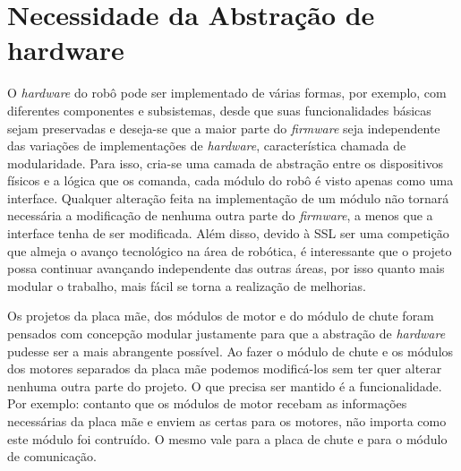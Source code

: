 \chapter{Necessidade da Abstração de hardware}\label{cap:necessidade_abstr_hw}

O \textit{hardware} do robô pode ser implementado de várias formas, por exemplo, com diferentes componentes e subsistemas, desde que suas funcionalidades básicas sejam preservadas e deseja-se que a maior parte do \textit{firmware} seja independente das variações de implementações de \textit{hardware}, característica chamada de modularidade. Para isso, cria-se uma camada de abstração entre os dispositivos físicos e a lógica que os comanda, cada módulo do robô é visto apenas como uma interface. Qualquer alteração feita na implementação de um módulo não tornará necessária a modificação de nenhuma outra parte do \textit{firmware}, a menos que a interface tenha de ser modificada. Além disso, devido à SSL ser uma competição que almeja o avanço tecnológico na área de robótica, é interessante que o projeto possa continuar avançando independente das outras áreas, por isso quanto mais modular o trabalho, mais fácil se torna a realização de melhorias.

Os projetos da placa mãe, dos módulos de motor e do módulo de chute foram pensados com concepção modular justamente para que a abstração de \textit{hardware} pudesse ser a mais abrangente possível. Ao fazer o módulo de chute e os módulos dos motores separados da placa mãe podemos modificá-los sem ter quer alterar nenhuma outra parte do projeto. O que precisa ser mantido é a funcionalidade. Por exemplo: contanto que os módulos de motor recebam as informações necessárias da placa mãe e enviem as certas para os motores, não importa como este módulo foi contruído. O mesmo vale para a placa de chute e para o módulo de comunicação.

